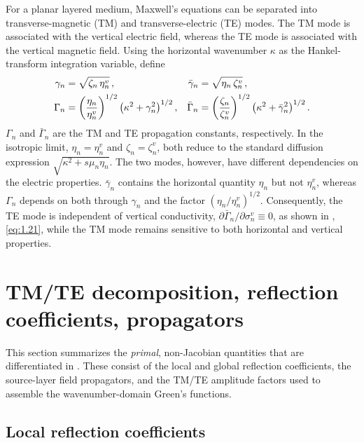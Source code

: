 \documentclass[12pt]{report}
\begin{document}
For a planar layered medium, Maxwell's equations can be separated into
transverse-magnetic (TM) and transverse-electric (TE) modes. The TM mode
is associated with the vertical electric field, whereas the TE mode is
associated with the vertical magnetic field. Using the horizontal
wavenumber \(\kappa\) as the Hankel-transform integration variable, define
\begin{align}
    \gamma_n  &= \sqrt{\zeta_n\,\eta^v_n\vphantom{)}}\,, &
    \bar\gamma_n &= \sqrt{\eta_n\,\zeta^v_n\vphantom{)}}\,,
    \label{eq:gamma-def}\\
    \Gamma_n &= \left(\frac{\eta_n}{\eta^v_n}\right)^{1/2}
                \left(\kappa^2+\gamma_n^2\right)^{1/2},
             &
    \bar\Gamma_n &= \left(\frac{\zeta_n}{\zeta^v_n}\right)^{1/2}
                \left(\kappa^2+\bar\gamma_n^2\right)^{1/2}.
    \label{eq:Gamma-def}
\end{align}
\(\Gamma_n\) and \(\bar\Gamma_n\) are the TM and TE propagation
constants, respectively. In the isotropic limit,
\(\eta_n=\eta_n^v\) and \(\zeta_n=\zeta_n^v\), both reduce to the standard
diffusion expression \(\sqrt{\kappa^2+s\mu_n\eta_n}\). The two modes,
however, have different dependencies on the electric properties.
\(\bar\gamma_n\) contains the horizontal quantity \(\eta_n\) but not
\(\eta_n^v\), whereas \(\Gamma_n\) depends on both through \(\gamma_n\)
and the factor \((\eta_n/\eta_n^v)^{1/2}\). Consequently, the TE mode is
independent of vertical conductivity,
\(\partial\bar\Gamma_n/\partial\sigma_n^v\equiv0\), as shown in
, \eqref{eq:1.21}, while the TM mode remains sensitive to
both horizontal and vertical properties.

\section{TM/TE decomposition, reflection coefficients, propagators}
\label{sec:tmte}

This section summarizes the \emph{primal}, non-Jacobian quantities
that are differentiated in . These consist of the local and
global reflection coefficients, the source-layer field propagators, and
the TM/TE amplitude factors used to assemble the wavenumber-domain
Green's functions.

\subsection{Local reflection coefficients}
\label{sec:local-refl-ch3}
\end{document}
